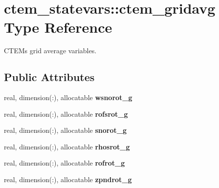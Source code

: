 \hypertarget{structctem__statevars_1_1ctem__gridavg}{}\section{ctem\+\_\+statevars\+:\+:ctem\+\_\+gridavg Type Reference}
\label{structctem__statevars_1_1ctem__gridavg}


C\+T\+E\+M\textquotesingle{}s grid average variables.  


\subsection*{Public Attributes}
\begin{DoxyCompactItemize}
\item 
\hypertarget{structctem__statevars_1_1ctem__gridavg_a75acd3d8249ffc3a379ccfa0722c38a2}{}real, dimension(\+:), allocatable {\bfseries wsnorot\+\_\+g}\label{structctem__statevars_1_1ctem__gridavg_a75acd3d8249ffc3a379ccfa0722c38a2}

\item 
\hypertarget{structctem__statevars_1_1ctem__gridavg_a42c74b91d8de8ed415a8c0b031a93bc3}{}real, dimension(\+:), allocatable {\bfseries rofsrot\+\_\+g}\label{structctem__statevars_1_1ctem__gridavg_a42c74b91d8de8ed415a8c0b031a93bc3}

\item 
\hypertarget{structctem__statevars_1_1ctem__gridavg_a8b40861afa001ea7b12a77e9bb6e7ca2}{}real, dimension(\+:), allocatable {\bfseries snorot\+\_\+g}\label{structctem__statevars_1_1ctem__gridavg_a8b40861afa001ea7b12a77e9bb6e7ca2}

\item 
\hypertarget{structctem__statevars_1_1ctem__gridavg_a2353e63cdbe0eb3477b60d06957db90f}{}real, dimension(\+:), allocatable {\bfseries rhosrot\+\_\+g}\label{structctem__statevars_1_1ctem__gridavg_a2353e63cdbe0eb3477b60d06957db90f}

\item 
\hypertarget{structctem__statevars_1_1ctem__gridavg_a50107bc6940d36d1cbcaa71658dc0d83}{}real, dimension(\+:), allocatable {\bfseries rofrot\+\_\+g}\label{structctem__statevars_1_1ctem__gridavg_a50107bc6940d36d1cbcaa71658dc0d83}

\item 
\hypertarget{structctem__statevars_1_1ctem__gridavg_acd4b2c5ad0ac64082761288826546bbc}{}real, dimension(\+:), allocatable {\bfseries zpndrot\+\_\+g}\label{structctem__statevars_1_1ctem__gridavg_acd4b2c5ad0ac64082761288826546bbc}


\end{DoxyCompactItemize}
